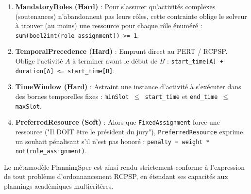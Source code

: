 \begin{enumerate}
    \item \textbf{MandatoryRoles (Hard)} : 
    Pour s'assurer qu'activités complexes (soutenances) n'abandonnent pas leurs rôles, cette contrainte oblige le solveur à trouver (au moins) une ressource pour chaque rôle énuméré : \texttt{sum(bool2int(role\_assignment)) >= 1}.
    
    \item \textbf{TemporalPrecedence (Hard)} :
    Emprunt direct au PERT / RCPSP. Oblige l'activité $A$ à terminer avant le début de $B$ : \texttt{start\_time[A] + duration[A] <= start\_time[B]}.
    
    \item \textbf{TimeWindow (Hard)} :
    Astraint une instance d'activité à s'exécuter dans des bornes temporelles fixes : \texttt{minSlot $\leq$ start\_time} et \texttt{end\_time $\leq$ maxSlot}.
    
    \item \textbf{PreferredResource (Soft)} :
    Alors que \texttt{FixedAssignment} force une ressource ("Il DOIT être le président du jury"), \texttt{PreferredResource} exprime un souhait pénalisant s'il n'est pas honoré : \texttt{penalty = weight * not(role\_assignment)}.
\end{enumerate}

Le métamodèle PlanningSpec est ainsi rendu strictement conforme à l'expression de tout problème d'ordonnancement RCPSP, en étendant ses capacités aux plannings académiques multicritères.
